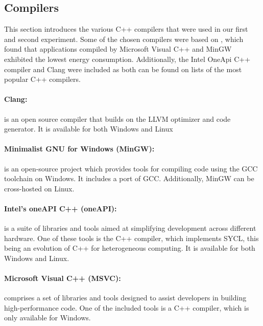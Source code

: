 \subsection{Compilers}

This section introduces the various C++ compilers that were used in our first and second experiment. Some of the chosen compilers were based on \cite{hassan2017}, which found that applications compiled by Microsoft Visual C++ and MinGW exhibited the lowest energy consumption. Additionally, the Intel OneApi C++ compiler and Clang were included as both can be found on lists of the most popular C++ compilers\cite{mycplus, educba, softwaretestinghelp}. 



\paragraph{Clang:} is an open source compiler that builds on the LLVM optimizer and code generator. It is available for both Windows and Linux\cite{clang}

\paragraph*{Minimalist GNU for Windows (MinGW):} is an open-source project which provides tools for compiling code using the GCC toolchain on Windows. It includes a port of GCC. Additionally, MinGW can be cross-hosted on Linux.\cite{mingw}


\paragraph*{Intel's oneAPI C++ (oneAPI):} is a suite of libraries and tools aimed at simplifying development across different hardware. One of these tools is the C++ compiler, which implements SYCL, this being an evolution of C++ for heterogeneous computing. It is available for both Windows and Linux.\cite{oneapi}

\paragraph*{Microsoft Visual C++ (MSVC):}  comprises a set of libraries and tools designed to assist developers in building high-performance code. One of the included tools is a C++ compiler, which is only available for Windows\cite{msvc}.
